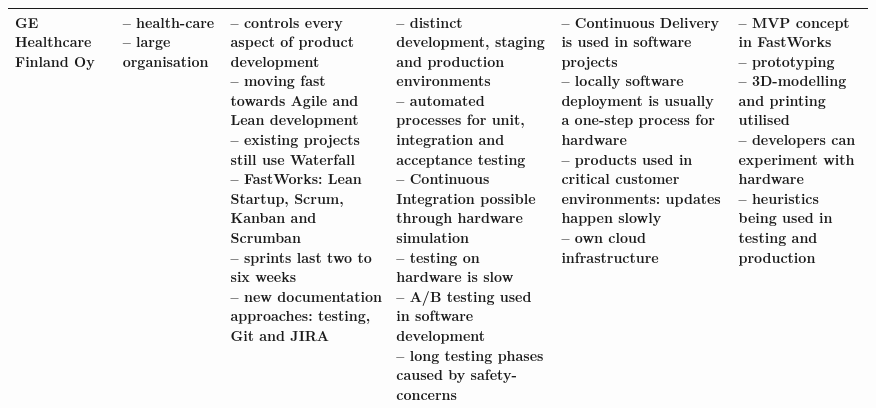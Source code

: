 \documentclass[english]{tktltiki2}
\begin{document}
\begin{landscape}
\begin{longtable}{|p{2.5cm}|p{1.5cm}|p{4cm}|p{4cm}|p{4cm}|p{4cm}|}
        GE Healthcare Finland Oy &
        \parbox[t]{1.5cm}{– health-care \\
                          – large organisation} &
        \parbox[t]{4cm}{– controls every aspect of product development \\
                        – moving fast towards Agile and Lean development \\
                        – existing projects still use Waterfall \\
                        – FastWorks: Lean Startup, Scrum, Kanban and Scrumban \\
                        – sprints last two to six weeks \\
                        – new documentation approaches: testing, Git and JIRA} &
        \parbox[t]{4cm}{– distinct development, staging and production environments \\
                        – automated processes for unit, integration and acceptance testing \\
                        – Continuous Integration possible through hardware simulation \\
                        – testing on hardware is slow \\
                        – A/B testing used in software development \\
                        – long testing phases caused by safety-concerns} &
        \parbox[t]{4cm}{– Continuous Delivery is used in software projects \\
                        – locally software deployment is usually a one-step process for hardware \\
                        – products used in critical customer environments: updates happen slowly \\
                        – own cloud infrastructure} &
        \parbox[t]{4cm}{– MVP concept in FastWorks \\
                        – prototyping \\
                        – 3D-modelling and printing utilised \\
                        – developers can experiment with hardware \\
                        – heuristics being used in testing and production} \\

        \hline


\end{longtable}
\end{landscape}
\end{document}
